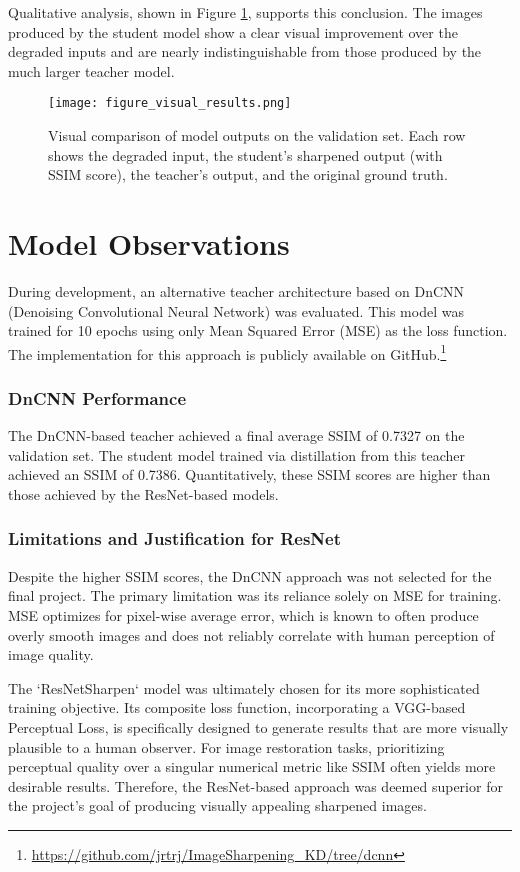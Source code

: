 \documentclass[12pt,a4paper]{article}
\begin{document}
Qualitative analysis, shown in Figure \ref{fig:visual_results}, supports this conclusion. The images produced by the student model show a clear visual improvement over the degraded inputs and are nearly indistinguishable from those produced by the much larger teacher model.

\begin{figure}[htbp]
    \centering
    \texttt{[image: figure\_visual\_results.png]}
    \caption{Visual comparison of model outputs on the validation set. Each row shows the degraded input, the student's sharpened output (with SSIM score), the teacher's output, and the original ground truth.}
    \label{fig:visual_results}
\end{figure}

\newpage
\section{Model Observations}
During development, an alternative teacher architecture based on DnCNN (Denoising Convolutional Neural Network) was evaluated. This model was trained for 10 epochs using only Mean Squared Error (MSE) as the loss function. The implementation for this approach is publicly available on GitHub.\footnote{\href{https://github.com/jrtrj/ImageSharpening_KD/tree/dcnn}{https://github.com/jrtrj/ImageSharpening\_KD/tree/dcnn}}

\subsubsection{DnCNN Performance}
The DnCNN-based teacher achieved a final average SSIM of 0.7327 on the validation set. The student model trained via distillation from this teacher achieved an SSIM of 0.7386. Quantitatively, these SSIM scores are higher than those achieved by the ResNet-based models.

\subsubsection{Limitations and Justification for ResNet}
Despite the higher SSIM scores, the DnCNN approach was not selected for the final project. The primary limitation was its reliance solely on MSE for training. MSE optimizes for pixel-wise average error, which is known to often produce overly smooth images and does not reliably correlate with human perception of image quality.

The `ResNetSharpen` model was ultimately chosen for its more sophisticated training objective. Its composite loss function, incorporating a VGG-based Perceptual Loss, is specifically designed to generate results that are more visually plausible to a human observer. For image restoration tasks, prioritizing perceptual quality over a singular numerical metric like SSIM often yields more desirable results. Therefore, the ResNet-based approach was deemed superior for the project's goal of producing visually appealing sharpened images.
\end{document}

